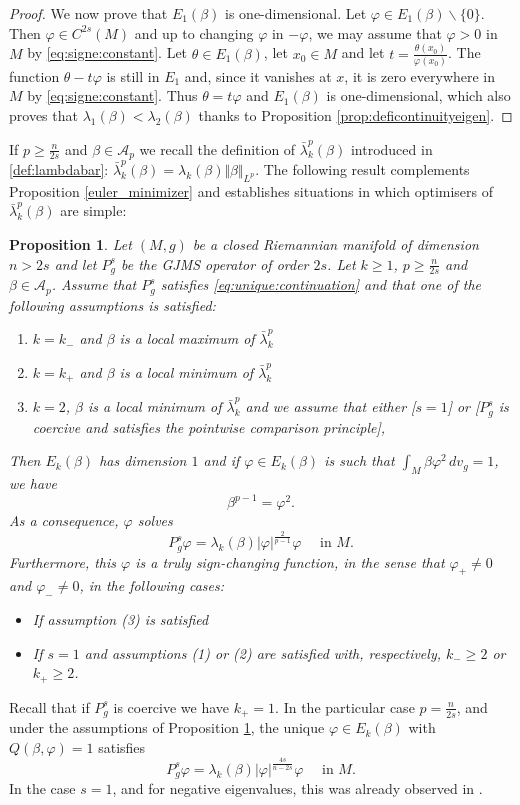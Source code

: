 \documentclass[10pt]{amsart}
\numberwithin{equation}{section}
\newcommand{\vp}{\varphi}
\theoremstyle{plain}
\newtheorem{prop}[theo]{Proposition}%
\theoremstyle{remark}
\begin{document}
\begin{proof}
We now prove that $E_1(\beta)$ is one-dimensional. Let $\vp \in E_1(\beta) \backslash \{0\}$. Then $\vp \in C^{2s}(M)$ and up to changing $\vp$ in $-\vp$, we may assume that $\vp >0$ in $M$ by \eqref{eq:signe:constant}. Let $\theta \in E_1(\beta)$, let $x_0 \in M$ and let $t = \frac{\theta(x_0)}{\vp(x_0)}$. The function $\theta - t \vp$ is still in $E_1$ and, since it vanishes at $x$, it is zero everywhere in $M$ by \eqref{eq:signe:constant}. Thus $\theta = t \vp$ and $E_1(\beta)$ is one-dimensional, which also proves that $\lambda_1(\beta) < \lambda_2(\beta)$ thanks to Proposition \ref{prop:deficontinuityeigen}. 
\end{proof}

If $p \ge \frac{n}{2s}$ and $\beta \in \mathcal{A}_p$ we recall the definition of $ \bar{\lambda}_k^p(\beta)$ introduced in \eqref{def:lambdabar}: $ \bar{\lambda}_k^p(\beta) = \lambda_k(\beta) \Vert \beta \Vert_{L^p}$. The following result complements Proposition \ref{euler_minimizer} and establishes situations in which optimisers of $ \bar{\lambda}_k^p(\beta)$ are simple: 

\begin{prop} \label{prop:espace1dim}
Let $(M,g)$ be a closed Riemannian manifold of dimension $n >2s$ and let $P_g^s$ be the GJMS operator of order $2s$. Let $k \ge 1$, $p \ge\frac{n}{2s}$ and $\beta \in \mathcal{A}_p$. Assume that $P_g^s$ satisfies \eqref{eq:unique:continuation} and that one of the following assumptions is satisfied:
\begin{enumerate}
\item $k = k_-$ and $\beta$ is a local maximum of $ \bar{\lambda}_k^p$
\item $k = k_+$ and $\beta$ is a local minimum of $ \bar{\lambda}_k^p$
\item $k=2$, $\beta$ is a local minimum of $ \bar{\lambda}_k^p$ and we assume that either [$s=1$] or [$P_g^s$ is coercive and satisfies the pointwise comparison principle], 
\end{enumerate}
Then $E_k(\beta)$ has dimension $1$ and if  $\vp \in E_k(\beta)$ is such that  $\int_M \beta \vp^2 \, dv_g = 1$, we have 
$$ \beta^{p-1} = \vp^2.$$
As a consequence, $\vp$ solves   
$$ P_g^s \vp = \lambda_k(\beta) |\vp|^{\frac{2}{p-1}} \vp \quad \text{ in } M.$$
Furthermore, this $\vp$ is a truly sign-changing function, in the sense that $\vp_+ \neq 0$ and $\vp_- \neq 0$, in the following cases: 
\begin{itemize}
\item  If assumption (3) is satisfied
\item If $s=1$ and assumptions (1) or (2) are satisfied with, respectively, $k_- \ge2$ or $k_+ \ge 2$. 
\end{itemize}
\end{prop}
Recall that if $P_g^s$ is coercive we have $k_+ = 1$. In the particular case $p = \frac{n}{2s}$, and under the assumptions of Proposition \ref{prop:espace1dim}, the unique $\vp \in E_k(\beta)$ with $Q(\beta, \vp) = 1$ satisfies 
$$ P_g^s \vp =  \lambda_k(\beta)|\vp|^{\frac{4s}{n-2s}} \vp \quad \text{ in } M.$$
In the case $s=1$, and for negative eigenvalues, this was already observed in \cite[Remark 6.1]{GurskyPerez}. 
\end{document}
